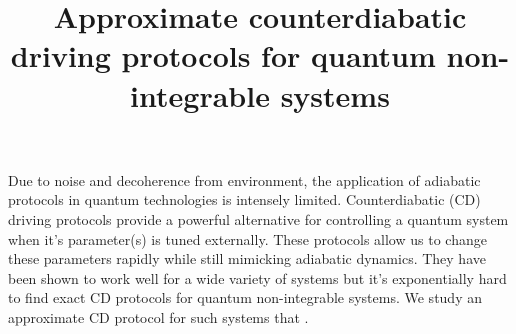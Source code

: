\documentclass[11pt,a4paper]{article}
\title{Approximate counterdiabatic driving protocols for quantum non-integrable systems  }
\begin{document}
\maketitle


Due to noise and decoherence from environment, the application of adiabatic protocols in quantum technologies is intensely limited. Counterdiabatic (CD) driving protocols provide a powerful alternative for controlling a quantum system when it's parameter(s) is tuned externally. These protocols allow us to change these parameters rapidly while still mimicking adiabatic dynamics. They have been shown to work well for a wide variety of systems but it's exponentially hard to find exact CD protocols for quantum non-integrable systems. We study an approximate CD protocol for such systems that .


 



 


%
\end{document}

